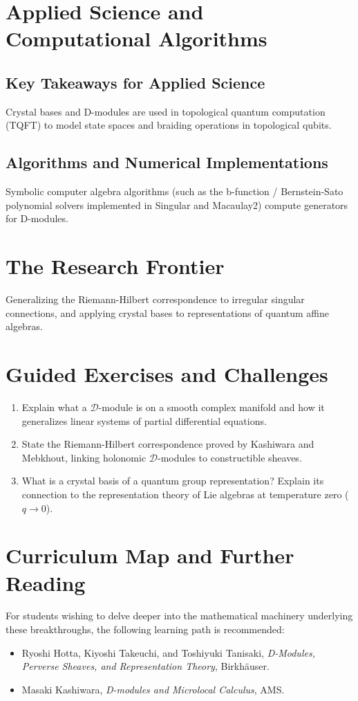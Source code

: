 \section{Applied Science and Computational Algorithms}
\subsection{Key Takeaways for Applied Science}
Crystal bases and D-modules are used in topological quantum computation (TQFT) to model state spaces and braiding operations in topological qubits.

\subsection{Algorithms and Numerical Implementations}
Symbolic computer algebra algorithms (such as the b-function / Bernstein-Sato polynomial solvers implemented in Singular and Macaulay2) compute generators for D-modules.

\section{The Research Frontier}
Generalizing the Riemann-Hilbert correspondence to irregular singular connections, and applying crystal bases to representations of quantum affine algebras.

\section{Guided Exercises and Challenges}
\begin{enumerate}[label=\textbf{\arabic*.}]
  \item Explain what a $\mathcal{D}$-module is on a smooth complex manifold and how it generalizes linear systems of partial differential equations.
  \item State the Riemann-Hilbert correspondence proved by Kashiwara and Mebkhout, linking holonomic $\mathcal{D}$-modules to constructible sheaves.
  \item What is a crystal basis of a quantum group representation? Explain its connection to the representation theory of Lie algebras at temperature zero ($q \to 0$).
\end{enumerate}

\section{Curriculum Map and Further Reading}
For students wishing to delve deeper into the mathematical machinery underlying these breakthroughs, the following learning path is recommended:
\begin{itemize}
  \item Ryoshi Hotta, Kiyoshi Takeuchi, and Toshiyuki Tanisaki, \emph{D-Modules, Perverse Sheaves, and Representation Theory}, Birkh\"auser.
  \item Masaki Kashiwara, \emph{D-modules and Microlocal Calculus}, AMS.
\end{itemize}

